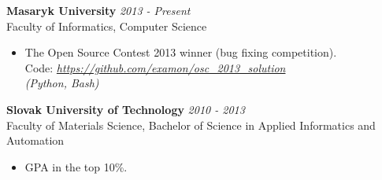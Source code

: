 \documentclass{res}
\begin{document}
\begin{resume}
		{\bf Masaryk University} \hfill \emph{2013 - Present} \\
			Faculty of Informatics, Computer Science

			\begin{itemize} \itemsep -2pt
				\item The Open Source Contest 2013 winner (bug fixing competition).\\
				Code: \emph{\href{https://github.com/examon/osc\_2013\_solution}{https://github.com/examon/osc\_2013\_solution}}\\
				\emph{(Python, Bash)}
			\end{itemize}

		{\bf Slovak University of Technology} \hfill \emph{2010 - 2013} \\
			Faculty of Materials Science, Bachelor of Science in Applied Informatics and Automation
			\begin{itemize} \itemsep -2pt
				\item GPA in the top 10\%.
			\end{itemize}

	\end{resume}
\end{document}
